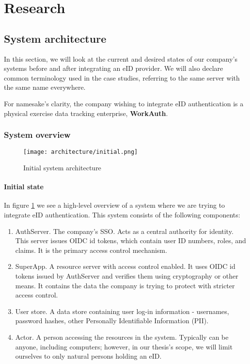 \section{Research}


\subsection{System architecture}

In this section, we will look at the current and desired states of our company's systems before and after integrating an eID provider. We will also declare common terminology used in the case studies, referring to the same server with the same name everywhere.

For namesake's clarity, the company wishing to integrate eID authentication is a physical exercise data tracking enterprise, \textbf{WorkAuth}.

\subsubsection{System overview}

\begin{figure}
  \centering
  \texttt{[image: architecture/initial.png]}
  \caption{Initial system architecture}
  \label{fig:sys-highlevel}
\end{figure}


\paragraph{Initial state}

In figure \ref{fig:sys-highlevel} we see a high-level overview of a system where we are trying to integrate eID authentication. This system consists of the following components:

\begin{enumerate}
  \item AuthServer. The company's SSO. Acts as a central authority for identity. This server issues OIDC id tokens, which contain user ID numbers, roles, and claims. It is the primary access control mechanism.
  \item SuperApp. A resource server with access control enabled. It uses OIDC id tokens issued by AuthServer and verifies them using cryptography or other means. It contains the data the company is trying to protect with stricter access control.
  \item User store. A data store containing user log-in information - usernames, password hashes, other Personally Identifiable Information (PII).
  \item Actor. A person accessing the resources in the system. Typically can be anyone, including computers; however, in our thesis's scope, we will limit ourselves to only natural persons holding an eID.
\end{enumerate}

